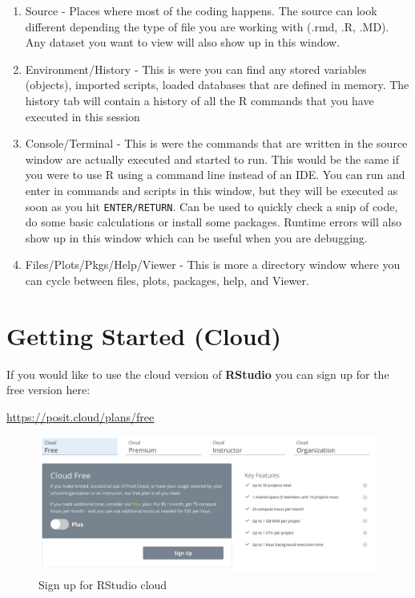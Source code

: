 \documentclass[
]{book}
\begin{document}
\begin{enumerate}
\def\labelenumi{\arabic{enumi}.}
\item
  Source - Places where most of the coding happens. The source can look different depending the type of file you are working with (.rmd, .R, .MD). Any dataset you want to view will also show up in this window.
\item
  Environment/History - This is were you can find any stored variables (objects), imported scripts, loaded databases that are defined in memory. The history tab will contain a history of all the R commands that you have executed in this session
\item
  Console/Terminal - This is were the commands that are written in the source window are actually executed and started to run. This would be the same if you were to use R using a command line instead of an IDE. You can run and enter in commands and scripts in this window, but they will be executed as soon as you hit \texttt{ENTER/RETURN}. Can be used to quickly check a snip of code, do some basic calculations or install some packages. Runtime errors will also show up in this window which can be useful when you are debugging.
\item
  Files/Plots/Pkgs/Help/Viewer - This is more a directory window where you can cycle between files, plots, packages, help, and Viewer.
\end{enumerate}

\hypertarget{getting-started-cloud}{%
\section{Getting Started (Cloud)}\label{getting-started-cloud}}

If you would like to use the cloud version of \textbf{RStudio} you can sign up for the free version here:

\url{https://posit.cloud/plans/free}

\begin{figure}
\includegraphics[width=17.6in]{images/2.2rcloud} \caption{Sign up for RStudio cloud}\label{fig:unnamed-chunk-6}
\end{figure}
\end{document}
